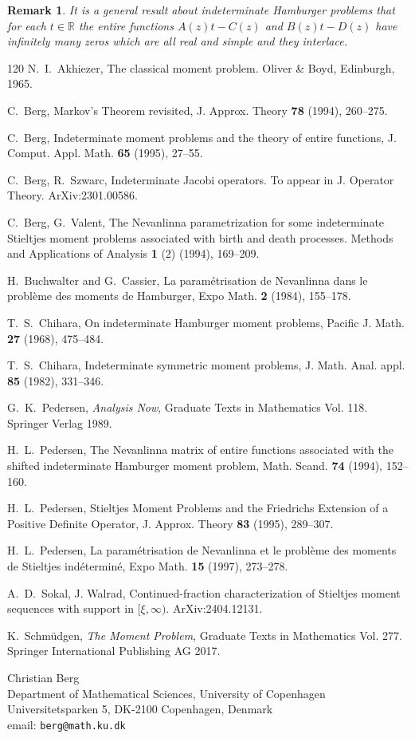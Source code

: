 \documentclass[12pt]{article}
\newtheorem{rem}[thm]{Remark}
\newcommand{\R}{\mathbb{R}}
\def\R{\mathbb{R}}
\begin{document}
\begin{rem}{\rm It is a general result about indeterminate Hamburger problems that for each $t\in\R$ the entire functions $A(z)t-C(z)$ and $B(z)t-D(z)$ have infinitely many zeros which are all real and simple and  they interlace.
}
\end{rem}

\begin{thebibliography}{120}
 N.~I.~Akhiezer, The classical moment problem. Oliver \& Boyd, Edinburgh, 1965.

 C.~Berg, Markov's Theorem revisited, J. Approx. Theory {\bf 78} (1994), 260--275.

 C.~Berg, Indeterminate moment problems  and the theory of entire functions, J. Comput. Appl. Math. {\bf 65} (1995), 27--55.

 C.~Berg, R.~Szwarc, Indeterminate Jacobi operators. To appear in J. Operator Theory. ArXiv:2301.00586.

 C.~Berg, G.~Valent, The Nevanlinna parametrization for some indeterminate Stieltjes moment problems associated with birth and death processes.
Methods and Applications of Analysis {\bf 1} (2) (1994), 169--209.

 H.~Buchwalter and G.~Cassier, La param\'etrisation de Nevanlinna dans le probl{\`e}me des moments de Hamburger, Expo Math. {\bf 2} (1984), 155--178.

 T.~S.~Chihara, On indeterminate Hamburger moment problems, Pacific J. Math. {\bf 27} (1968), 475--484.

 T.~S.~Chihara, Indeterminate symmetric moment problems, J. Math. Anal. appl. {\bf 85} (1982), 331--346.

 G.~K.~Pedersen, {\it Analysis Now}, Graduate Texts in Mathematics Vol. 118. Springer Verlag 1989. 

 H.~L.~Pedersen, The Nevanlinna matrix of entire functions associated with the shifted indeterminate Hamburger moment problem, Math. Scand. {\bf 74} (1994), 152--160.

 H.~L.~Pedersen, Stieltjes Moment Problems and the Friedrichs Extension of a Positive Definite Operator, J. Approx. Theory {\bf 83} (1995), 289--307.

 H.~L.~Pedersen, La param\'etrisation de Nevanlinna et le probl{\`e}me des moments de Stieltjes ind\'etermin\'e, Expo Math. {\bf 15} (1997), 273--278.

 A.~D.~Sokal,  J.  Walrad, Continued-fraction characterization of Stieltjes moment sequences with support in $[\xi,\infty)$. ArXiv:2404.12131.
 
 K.~Schm\"{u}dgen, {\it The Moment Problem}, Graduate Texts in Mathematics Vol. 277. Springer International Publishing AG 2017. 
 
\end{thebibliography}

\noindent
Christian Berg\\
Department of Mathematical Sciences, University of Copenhagen\\
Universitetsparken 5, DK-2100 Copenhagen, Denmark\\
email: {\tt{berg@math.ku.dk}}
\end{document}
